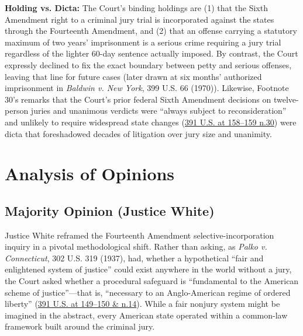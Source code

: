 \documentclass[12pt]{article}
\begin{document}
\textbf{Holding vs. Dicta:} The Court's binding holdings are (1) that the Sixth Amendment right to a criminal jury trial is incorporated against the states through the Fourteenth Amendment, and (2) that an offense carrying a statutory maximum of two years' imprisonment is a serious crime requiring a jury trial regardless of the lighter 60-day sentence actually imposed. By contrast, the Court expressly declined to fix the exact boundary between petty and serious offenses, leaving that line for future cases (later drawn at six months' authorized imprisonment in \textit{Baldwin v. New York}, 399 U.S. 66 (1970)). Likewise, Footnote 30's remarks that the Court's prior federal Sixth Amendment decisions on twelve-person juries and unanimous verdicts were ``always subject to reconsideration'' and unlikely to require widespread state changes (\href{https://supreme.justia.com/cases/federal/us/391/145/}{391 U.S. at 158--159 n.30}) were dicta that foreshadowed decades of litigation over jury size and unanimity.

\section{Analysis of Opinions}

\subsection{Majority Opinion (Justice White)}

Justice White reframed the Fourteenth Amendment selective-incorporation inquiry in a pivotal methodological shift. Rather than asking, as \textit{Palko v. Connecticut}, 302 U.S. 319 (1937), had, whether a hypothetical ``fair and enlightened system of justice'' could exist anywhere in the world without a jury, the Court asked whether a procedural safeguard is ``fundamental to the American scheme of justice''---that is, ``necessary to an Anglo-American regime of ordered liberty'' (\href{https://supreme.justia.com/cases/federal/us/391/145/}{391 U.S. at 149--150 \& n.14}). While a fair nonjury system might be imagined in the abstract, every American state operated within a common-law framework built around the criminal jury.
\end{document}
